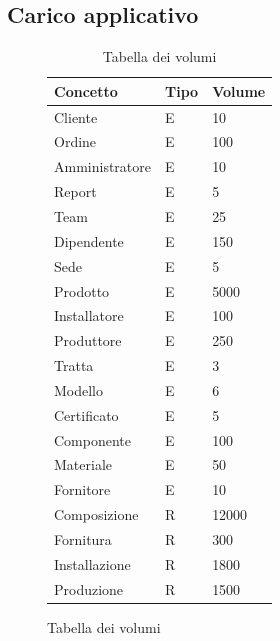 \documentclass{article}
\begin{document}
\subsection{Carico applicativo}

\begin{figure}[H]
    \begin{table}[H]
        \centering
        \begin{tabular}{|l|l|l|}
            \hline
            \textbf{Concetto} & \textbf{Tipo} & \textbf{Volume} \\ \hline
            Cliente           & E             & 10              \\ \hline
            Ordine            & E             & 100             \\ \hline
            Amministratore    & E             & 10              \\ \hline
            Report            & E             & 5               \\ \hline
            Team              & E             & 25              \\ \hline
            Dipendente        & E             & 150             \\ \hline
            Sede              & E             & 5               \\ \hline
            Prodotto          & E             & 5000            \\ \hline
            Installatore      & E             & 100             \\ \hline
            Produttore        & E             & 250             \\ \hline
            Tratta            & E             & 3               \\ \hline
            Modello           & E             & 6               \\ \hline
            Certificato       & E             & 5               \\ \hline
            Componente        & E             & 100             \\ \hline
            Materiale         & E             & 50              \\ \hline
            Fornitore         & E             & 10              \\ \hline
            Composizione      & R             & 12000           \\ \hline
            Fornitura         & R             & 300             \\ \hline
            Installazione     & R             & 1800            \\ \hline
            Produzione        & R             & 1500            \\ \hline
        \end{tabular}
        \caption{Tabella dei volumi}
    \end{table}
\end{figure}
\end{document}
